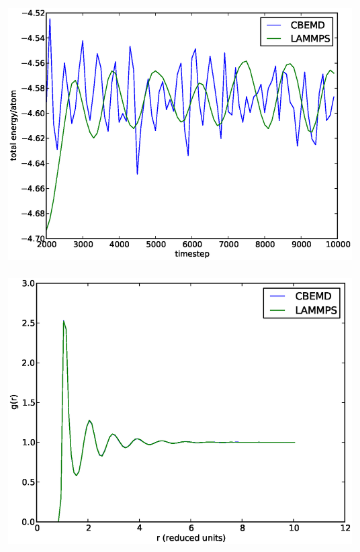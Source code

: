 \documentclass[12pt]{article}
\begin{document}
\begin{figure}[H]
\begin{subfigure}{0.5\textwidth}
	\includegraphics[width=\textwidth]{E_compare}
	\caption{}
	\end{subfigure}
	\begin{subfigure}{0.5\textwidth}
	\includegraphics[width=\textwidth]{gr_compare}
	\caption{}
	\end{subfigure}
	\begin{subfigure}{0.5\textwidth}

\end{subfigure}
\end{figure}
\end{document}
